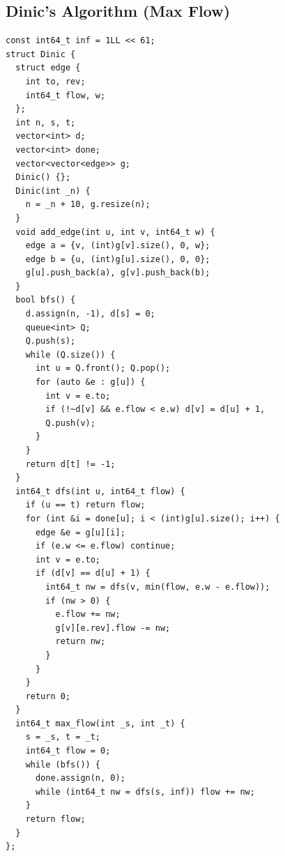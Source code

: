 \subsection{Dinic's Algorithm (Max Flow)}
\begin{verbatim}
const int64_t inf = 1LL << 61;
struct Dinic {
  struct edge {
    int to, rev;
    int64_t flow, w;
  };
  int n, s, t;
  vector<int> d;
  vector<int> done;
  vector<vector<edge>> g;
  Dinic() {};
  Dinic(int _n) {
    n = _n + 10, g.resize(n);
  }
  void add_edge(int u, int v, int64_t w) {
    edge a = {v, (int)g[v].size(), 0, w};
    edge b = {u, (int)g[u].size(), 0, 0};
    g[u].push_back(a), g[v].push_back(b);
  }
  bool bfs() {
    d.assign(n, -1), d[s] = 0;
    queue<int> Q;
    Q.push(s);
    while (Q.size()) {
      int u = Q.front(); Q.pop();
      for (auto &e : g[u]) {
        int v = e.to;
        if (!~d[v] && e.flow < e.w) d[v] = d[u] + 1,
        Q.push(v);
      }
    }
    return d[t] != -1;
  }
  int64_t dfs(int u, int64_t flow) {
    if (u == t) return flow;
    for (int &i = done[u]; i < (int)g[u].size(); i++) {
      edge &e = g[u][i];
      if (e.w <= e.flow) continue;
      int v = e.to;
      if (d[v] == d[u] + 1) {
        int64_t nw = dfs(v, min(flow, e.w - e.flow));
        if (nw > 0) {
          e.flow += nw;
          g[v][e.rev].flow -= nw;
          return nw;
        }
      }
    }
    return 0;
  }
  int64_t max_flow(int _s, int _t) {
    s = _s, t = _t;
    int64_t flow = 0;
    while (bfs()) {
      done.assign(n, 0);
      while (int64_t nw = dfs(s, inf)) flow += nw;
    }
    return flow;
  }
};
\end{verbatim}
